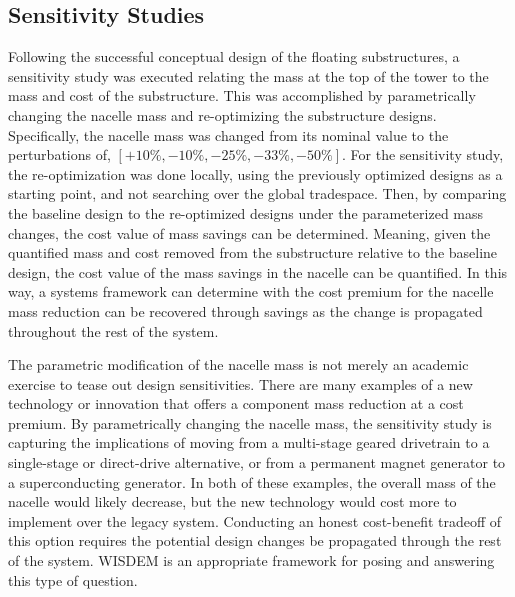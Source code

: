 \subsection{Sensitivity Studies}
Following the successful conceptual design of the floating
substructures, a sensitivity study was executed relating the mass at the top of the
tower to the mass and cost of the substructure.  This was accomplished
by parametrically changing the nacelle mass and re-optimizing the
substructure designs.  Specifically, the nacelle mass was changed from
its nominal value to the perturbations of, $[+10\%, -10\%, -25\%, -33\%,
  -50\%]$.  For the sensitivity study, the re-optimization was done locally,
using the previously optimized designs as a starting point, and not
searching over the global tradespace.  Then, by
comparing the baseline design to the re-optimized designs under the
parameterized mass changes, the cost value of mass savings can be
determined.  Meaning, given the quantified mass and cost removed from
the substructure relative to the baseline design, the cost value of the
mass savings in the nacelle can be quantified.  In this way, a systems
framework can determine with the cost premium for the nacelle mass
reduction can be recovered through savings as the change is propagated
throughout the rest of the system.

The parametric modification of the nacelle mass is not merely an
academic exercise to tease out design sensitivities.  There are many
examples of a new technology or innovation that offers a component mass
reduction at a cost premium.  By parametrically changing the nacelle
mass, the sensitivity study is capturing the implications of moving from a
multi-stage geared drivetrain to a single-stage or direct-drive
alternative, or from a permanent magnet generator to a superconducting
generator.  In both of these examples, the overall mass of the nacelle
would likely decrease, but the new technology would cost more to
implement over the legacy system.  Conducting an honest cost-benefit
tradeoff of this option requires the potential design changes be
propagated through the rest of the system.  WISDEM is an appropriate
framework for posing and answering this type of question.


